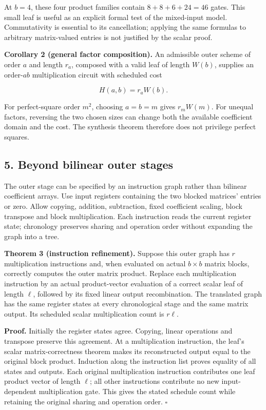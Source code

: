 \documentclass[
  11pt,
]{article}
\begin{document}
At \(b=4\), these four product families contain \(8+8+6+24=46\) gates.
This small leaf is useful as an explicit formal test of the mixed-input
model. Commutativity is essential to its cancellation; applying the same
formulas to arbitrary matrix-valued entries is not justified by the
scalar proof.

\textbf{Corollary 2 (general factor composition).} An admissible outer
scheme of order \(a\) and length \(r_a\), composed with a valid leaf of
length \(W(b)\), supplies an order-\(ab\) multiplication circuit with
scheduled cost

\[
H(a,b)=r_aW(b).
\tag{7}
\]

For perfect-square order \(m^2\), choosing \(a=b=m\) gives \(r_mW(m)\).
For unequal factors, reversing the two chosen sizes can change both the
available coefficient domain and the cost. The synthesis theorem
therefore does not privilege perfect squares.

\subsection{5. Beyond bilinear outer
stages}\label{beyond-bilinear-outer-stages}

The outer stage can be specified by an instruction graph rather than
bilinear coefficient arrays. Use input registers containing the two
blocked matrices' entries or zero. Allow copying, addition, subtraction,
fixed coefficient scaling, block transpose and block multiplication.
Each instruction reads the current register state; chronology preserves
sharing and operation order without expanding the graph into a tree.

\textbf{Theorem 3 (instruction refinement).} Suppose this outer graph
has \(r\) multiplication instructions and, when evaluated on actual
\(b\times b\) matrix blocks, correctly computes the outer matrix
product. Replace each multiplication instruction by an actual
product-vector evaluation of a correct scalar leaf of length \(\ell\),
followed by its fixed linear output recombination. The translated graph
has the same register states at every chronological stage and the same
matrix output. Its scheduled scalar multiplication count is \(r\ell\).

\textbf{Proof.} Initially the register states agree. Copying, linear
operations and transpose preserve this agreement. At a multiplication
instruction, the leaf's scalar matrix-correctness theorem makes its
reconstructed output equal to the original block product. Induction
along the instruction list proves equality of all states and outputs.
Each original multiplication instruction contributes one leaf product
vector of length \(\ell\); all other instructions contribute no new
input-dependent multiplication gate. This gives the stated schedule
count while retaining the original sharing and operation order.
\(\square\)
\end{document}
